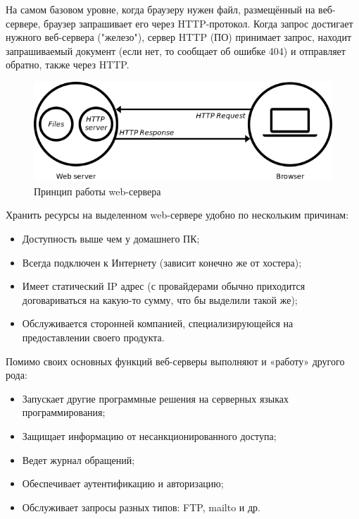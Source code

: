 На самом базовом уровне, когда браузеру нужен файл, размещённый на веб-сервере,
браузер запрашивает его через HTTP-протокол. Когда запрос достигает нужного
веб-сервера ("железо"), сервер HTTP (ПО) принимает запрос, находит запрашиваемый
документ (если нет, то сообщает об ошибке 404) и отправляет обратно, также через
HTTP.
\begin{figure}[H]
    \centering
    \includegraphics[scale=0.60]{inc/img/web-server.png}
    \caption{Принцип работы web-сервера}
\end{figure}

Хранить ресурсы на выделенном web-сервере удобно по нескольким причинам:
\begin{itemize}
    \item Доступность выше чем у домашнего ПК;
    \item Всегда подключен к Интернету (зависит конечно же от хостера);
    \item Имеет статический IP адрес (с провайдерами обычно приходится договариваться на какую-то сумму, что бы выделили такой же);
    \item Обслуживается сторонней компанией, специализирующейся на предоставлении своего продукта.
\end{itemize}

Помимо своих основных функций веб-серверы выполняют и «работу» другого рода:
\begin{itemize}
    \item Запускает другие программные решения на серверных языках программирования;
    \item Защищает информацию от несанкционированного доступа;
    \item Ведет журнал обращений;
    \item Обеспечивает аутентификацию и авторизацию;
    \item Обслуживает запросы разных типов: FTP, mailto и др.
\end{itemize}

